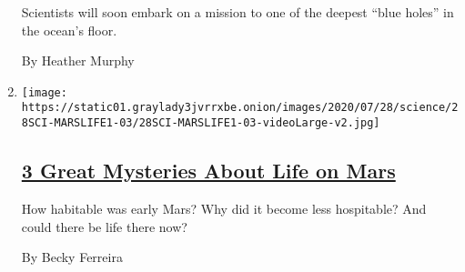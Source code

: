 \begin{enumerate}
  Scientists will soon embark on a mission to one of the deepest ``blue
  holes'' in the ocean's floor.

  By Heather Murphy
\item
  \texttt{[image: https://static01.graylady3jvrrxbe.onion/images/2020/07/28/science/28SCI-MARSLIFE1-03/28SCI-MARSLIFE1-03-videoLarge-v2.jpg]}

  \hypertarget{3-great-mysteries-about-life-on-mars}{%
  \subsection{\texorpdfstring{\href{/2020/07/24/science/mars-life-water.html}{3
  Great Mysteries About Life on
  Mars}}{3 Great Mysteries About Life on Mars}}\label{3-great-mysteries-about-life-on-mars}}

  How habitable was early Mars? Why did it become less hospitable? And
  could there be life there now?

  By Becky Ferreira
\end{enumerate}

